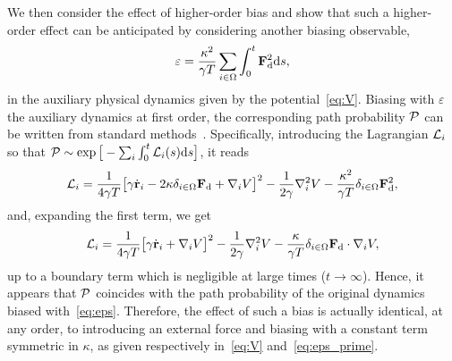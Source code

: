 \documentclass[pre, superscriptaddress, twocolumn,pre]{revtex4-1}
\begin{document}
We then consider the effect of higher-order bias and show that such a higher-order effect can be anticipated by considering another biasing observable,
\begin{equation}\label{eq:eps_prime}
	\varepsilon = \frac{\kappa^2}{\gamma T}\sum_{i\in\Omega}\int_0^t{\bf F}_{\rm d}^2{\rm d}s, 
\end{equation}
in the auxiliary physical dynamics given by the potential~\eqref{eq:V}. Biasing with $\varepsilon$ the auxiliary dynamics at first order, the corresponding path probability $\cal P$ can be written from standard methods~\cite{Martin1973, Dominicis1975}. Specifically, introducing the Lagrangian ${\cal L}_i$ so that ${\cal P}\sim\exp\big[-\sum_i\int_0^t{\cal L}_i(s){\rm d}s\big]$, it reads
\begin{equation}
	{\cal L}_i = \frac{1}{4\gamma T} \big[\gamma\dot{\bf r}_i - 2\kappa\delta_{i\in\Omega}{\bf F}_{\rm d} + \nabla_iV\big]^2 - \frac{1}{2\gamma} \nabla^2_iV - \frac{\kappa^2}{\gamma T}\delta_{i\in\Omega}{\bf F}_{\rm d}^2 ,
\end{equation}
and, expanding the first term, we get
\begin{equation}
	{\cal L}_i = \frac{1}{4\gamma T} \big[\gamma\dot{\bf r}_i + \nabla_iV\big]^2 - \frac{1}{2\gamma} \nabla^2_iV - \frac{\kappa}{\gamma T} \delta_{i\in\Omega}{\bf F}_{\rm d}\cdot\nabla_i V ,
\end{equation}
up to a boundary term which is negligible at large times ($t\to\infty$). Hence, it appears that $\cal P$ coincides with the path probability of the original dynamics biased with~\eqref{eq:eps}. Therefore, the effect of such a bias is actually identical, at any order, to introducing an external force and biasing with a constant term symmetric in $\kappa$, as given respectively in~\eqref{eq:V} and~\eqref{eq:eps_prime}.
\end{document}
